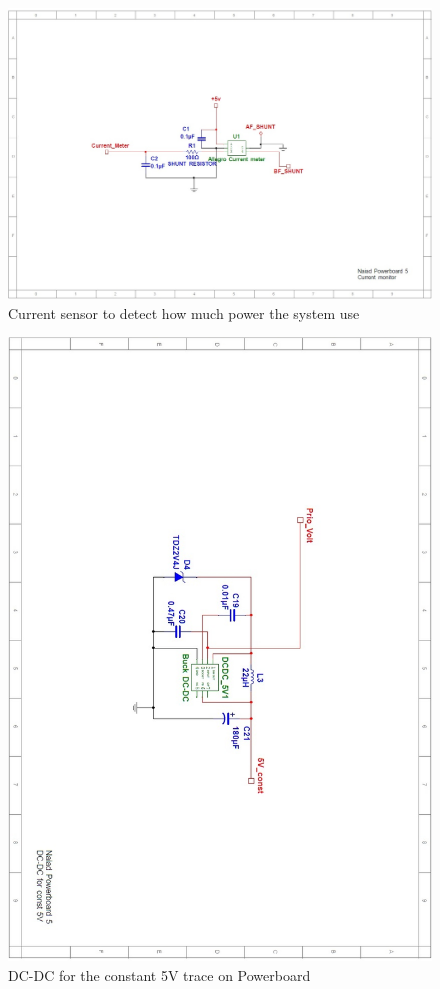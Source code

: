 \begin{figure}[!ht]
	\begin{center}
		\includegraphics[width=13.2cm]{./Images/Powerboard_Scematics/Current_monitor.jpg}
		\caption{Current sensor to detect how much power the system use}
	\end{center}
\end{figure}

\begin{figure}[!ht]
	\begin{center}
		\includegraphics[width=13.2cm]{./Images/Powerboard_Scematics/5_const.jpg}
		\caption{DC-DC for the constant 5V trace on Powerboard}
	\end{center}
\end{figure}

